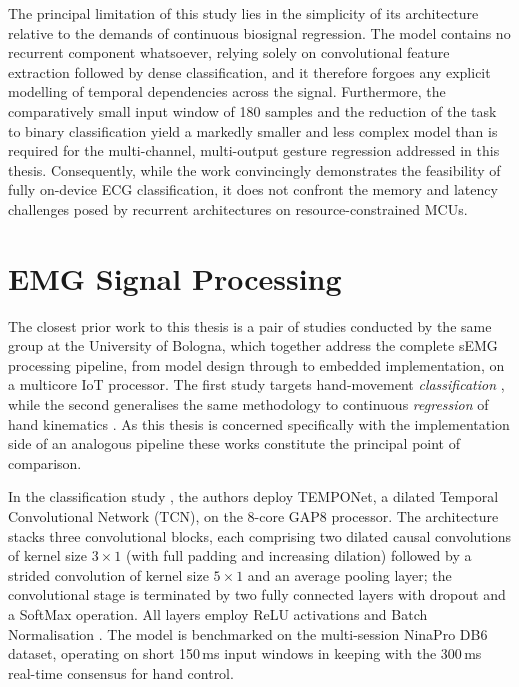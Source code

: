 \documentclass[12pt,DIV16,BCOR12mm,a4paper,footinclude=false,headinclude,parskip=half-,twoside,openright,cleardoublepage=empty,toc=index,bibliography=totoc,listof=totoc]{scrreprt}
\numberwithin{equation}{chapter}
\begin{document}
      The principal limitation of this study lies in the simplicity of its architecture relative to the
      demands of continuous biosignal regression. The model contains no recurrent component whatsoever,
      relying solely on convolutional feature extraction followed by dense classification, and it therefore
      forgoes any explicit modelling of temporal dependencies across the signal. Furthermore, the
      comparatively small input window of 180 samples and the reduction of the task to binary
      classification yield a markedly smaller and less complex model than is required for the multi-channel,
      multi-output gesture regression addressed in this thesis. Consequently, while the work convincingly
      demonstrates the feasibility of fully on-device ECG classification, it does not confront the memory
      and latency challenges posed by recurrent architectures on resource-constrained MCUs.


      \section{EMG Signal Processing}

      The closest prior work to this thesis is a pair of studies conducted by the same group at the
      University of Bologna, which together address the complete sEMG processing pipeline, from model design
      through to embedded implementation, on a multicore IoT processor. The first study targets hand-movement
      \emph{classification} \cite{zanghieriRobustRealTimeEmbedded2020}, while the second generalises the same
      methodology to continuous \emph{regression} of hand kinematics \cite{zanghieriSEMGbasedRegressionHand2021}.
      As this thesis is concerned specifically with the implementation side of an analogous pipeline
      these works constitute the principal point of comparison.

      In the classification study \cite{zanghieriRobustRealTimeEmbedded2020}, the authors deploy TEMPONet, a
      dilated Temporal Convolutional Network (TCN), on the 8-core GAP8 processor. The architecture stacks three
      convolutional blocks, each comprising two dilated causal convolutions of kernel size $3{\times}1$ (with full
      padding and increasing dilation) followed by a strided convolution of kernel size $5{\times}1$ and an average
      pooling layer; the convolutional stage is terminated by two fully connected layers with dropout and a SoftMax
      operation. All layers employ ReLU activations and Batch Normalisation
      \cite{zanghieriRobustRealTimeEmbedded2020}. The model is benchmarked on the multi-session NinaPro DB6 dataset,
      operating on short 150\,ms input windows in keeping with the 300\,ms real-time consensus for hand control.
\end{document}
